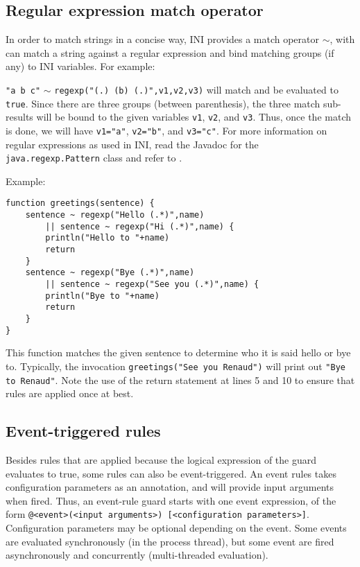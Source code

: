 \documentclass[11pt]{report}
\begin{document}
\subsection{Regular expression match operator\label{subsubsec:regexp}}

In order to match strings in a concise way, INI provides a match operator $\sim$, with can match a string against a regular expression \cite{friedl2006} and bind matching groups (if any) to INI variables. For example:

\texttt{"a b c"} $\sim$ \texttt{regexp("(.) (b) (.)",v1,v2,v3)} will match and be evaluated to \texttt{true}. Since there are three groups (between parenthesis), the three match sub-results will be bound to the given variables \texttt{v1}, \texttt{v2}, and \texttt{v3}. Thus, once the match is done, we will have \texttt{v1="a"}, \texttt{v2="b"}, and \texttt{v3="c"}. For more information on regular expressions as used in INI, read the Javadoc for the \texttt{java.regexp.Pattern} class and refer to \cite{friedl2006}.

Example:

\begin{lstlisting}
function greetings(sentence) {
	sentence ~ regexp("Hello (.*)",name)
		|| sentence ~ regexp("Hi (.*)",name) {
		println("Hello to "+name)
		return
	}
	sentence ~ regexp("Bye (.*)",name)
		|| sentence ~ regexp("See you (.*)",name) {
		println("Bye to "+name)
		return
	}
}
\end{lstlisting}

This function matches the given sentence to determine who it is said hello or bye to. Typically, the invocation \texttt{greetings("See you Renaud")} will print out \texttt{"Bye to Renaud"}. Note the use of the return statement at lines 5 and 10 to ensure that rules are applied once at best.

\subsection{Event-triggered rules}

Besides rules that are applied because the logical expression of the guard evaluates to true, some rules can also be event-triggered. An event rules takes configuration parameters as an annotation, and will provide input arguments when fired. Thus, an event-rule guard starts with one event expression, of the form \texttt{@<event>(<input arguments>) [<configuration parameters>]}. Configuration parameters may be optional depending on the event. Some events are evaluated synchronously (in the process thread), but some event are fired asynchronously and concurrently (multi-threaded evaluation).
\end{document}
